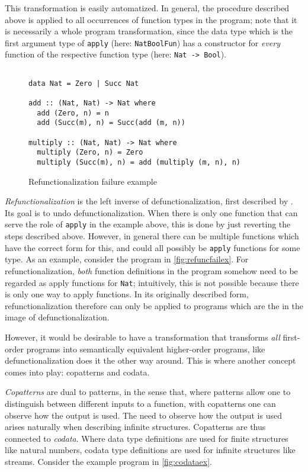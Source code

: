 This transformation is easily automatized. In general, the procedure described above is applied to all occurrences of function types in the program; note that it is necessarily a whole program transformation, since the data type which is the first argument type of \texttt{apply} (here: \texttt{NatBoolFun}) has a constructor for \textit{every} function of the respective function type (here: \texttt{Nat -> Bool}).

\begin{figure}
\begin{lstlisting}

data Nat = Zero | Succ Nat

add :: (Nat, Nat) -> Nat where
  add (Zero, n) = n
  add (Succ(m), n) = Succ(add (m, n))

multiply :: (Nat, Nat) -> Nat where
  multiply (Zero, n) = Zero
  multiply (Succ(m), n) = add (multiply (m, n), n)

\end{lstlisting}
\caption{Refunctionalization failure example}
\label{fig:refuncfailex}
\end{figure}

\textit{Refunctionalization} is the left inverse of defunctionalization, first described by \citet{danvy09refunctionalization}. Its goal is to undo defunctionalization. When there is only one function that can serve the role of \texttt{apply} in the example above, this is done by just reverting the steps described above. However, in general there can be multiple functions which have the correct form for this, and could all possibly be \texttt{apply} functions for some type. As an example, consider the program in \autoref{fig:refuncfailex}. For refunctionalization, \textit{both} function definitions in the program somehow need to be regarded as apply functions for \texttt{Nat}; intuitively, this is not possible because there is only one way to apply functions. In its originally described form, refunctionalization therefore can only be applied to programs which are the in the image of defunctionalization.

However, it would be desirable to have a transformation that transforms \textit{all} first-order programs into semantically equivalent higher-order programs, like defunctionalization does it the other way around. This is where another concept comes into play: copatterns and codata.

\textit{Copatterns} are dual to patterns, in the sense that, where patterns allow one to distinguish between different inputs to a function, with copatterns one can observe how the output is used. The need to observe how the output is used arises naturally when describing infinite structures. Copatterns are thus connected to \textit{codata}. Where data type definitions are used for finite structures like natural numbers, codata type definitions are used for infinite structures like streams. Consider the example program in \autoref{fig:codataex}.

